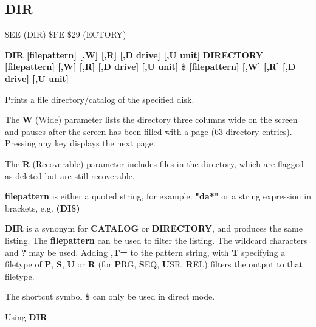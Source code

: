 
\newpage
\subsection{DIR}
\begin{description}[leftmargin=2cm,style=nextline]
\item [Token:] \$EE (DIR) \$FE \$29 (ECTORY)
\item [Format:] {\bf DIR [filepattern] [,W] [,R] [,D drive] [,U unit] }
                {\bf DIRECTORY [filepattern] [,W] [,R] [,D drive] [,U unit] }
                {\bf \$ [filepattern] [,W] [,R] [,D drive] [,U unit] }
\item [Usage:]  Prints a file directory/catalog of the specified disk.

   The {\bf W} (Wide) parameter lists the directory three columns wide
   on the screen and pauses after the screen has been filled with a page
   (63 directory entries). Pressing any key displays the next page.

   The {\bf R} (Recoverable) parameter includes files in the
   directory, which are flagged as deleted but are still
   recoverable.

   {\bf filepattern} is either a quoted string, for example: {\bf "da*"} or
   a string expression in brackets, e.g. {\bf (DI\$)}

   \drivedefinition

   \unitdefinition

\item [Remarks:]
   {\bf DIR} is a synonym for {\bf CATALOG}
   or {\bf DIRECTORY}, and produces the same listing.
   The {\bf filepattern} can be used to filter the listing.
   The wildcard characters {\bf *} and {\bf ?} may be used.
   Adding {\bf ,T=} to the pattern string, with {\bf T} specifying
   a filetype of {\bf P}, {\bf S}, {\bf U} or {\bf R}
   (for {\bf P}RG, {\bf S}EQ, {\bf U}SR, {\bf R}EL) filters the
   output to that filetype.

   The shortcut symbol {\bf \$} can only be used in direct mode.

\item [Examples:] Using {\bf DIR}


%
%
%
%
%


\end{description}
